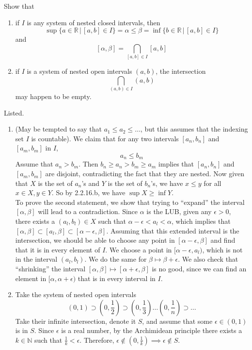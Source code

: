 \documentclass{article}
\begin{document}
    \begin{exercise}[Zorich 2.3.1]
    Show that 
    \begin{enumerate}
        \item if $I$ is any system of nested closed intervals, then 
        \[\sup\{ a \in \mathbb{R}\,|\, [a, b] \in I\} = \alpha \leq \beta = \inf\{ b \in \mathbb{R}\,|\,[a, b] \in I\}\]
        and 
        \[[\alpha, \beta] = \bigcap_{[a, b] \in I} [a, b]\]
        \item if $I$ is a system of nested open intervals $(a, b)$, the intersection
        \[\bigcap_{(a, b) \in I} (a, b)\] 
        may happen to be empty. 
    \end{enumerate}
    \end{exercise}

    \begin{solution}
    Listed. 
    \begin{enumerate}
        \item (May be tempted to say that $a_1 \leq a_2 \leq \ldots$, but this assumes that the indexing set $I$ is countable). We claim that for any two intervals $[a_n, b_n]$ and $[a_m, b_m]$ in $I$, 
        \[a_n \leq b_m\]
        Assume that $a_n > b_m$. Then $b_n \geq a_n > b_m \geq a_m$ implies that $[a_n, b_n]$ and $[a_m, b_m]$ are disjoint, contradicting the fact that they are nested. Now given that $X$ is the set of $a_n$'s and $Y$ is the set of $b_n$'s, we have $x \leq y$ for all $x \in X, y \in Y$. So by 2.2.16.b, we have $\sup{X} \geq \inf{Y}$. 
        \\
        To prove the second statement, we show that trying to ``expand'' the interval $[\alpha, \beta]$ will lead to a contradiction. Since $\alpha$ is the LUB, given any $\epsilon > 0$, there exists a $(a_l, b_l) \in X$ such that $\alpha - \epsilon < a_l < \alpha$, which implies that $ [\alpha, \beta] \subset [a_l, \beta] \subset [\alpha - \epsilon, \beta]$. Assuming that this extended interval is the intersection, we should be able to choose any point in $[\alpha - \epsilon, \beta]$ and find that it is in every element of $I$. We choose a point in $[\alpha - \epsilon, a_l)$, which is not in the interval $(a_l, b_l)$. We do the same for $\beta \mapsto \beta + \epsilon$. We also check that ``shrinking'' the interval $[\alpha, \beta] \mapsto [\alpha + \epsilon, \beta]$ is no good, since we can find an element in $[\alpha, \alpha + \epsilon)$ that is in every interval in $I$. 
        
        \item Take the system of nested open intervals 
        \[(0, 1) \supset (0, \frac{1}{2}) \supset (0, \frac{1}{3}) \ldots (0, \frac{1}{n}) \supset \ldots\]
        Take their infinite intersection, denote it $S$, and assume that some $\epsilon \in (0, 1)$ is in $S$. Since $\epsilon$ is a real number, by the Archimidean principle there exists a $k \in \mathbb{N}$ such that $\frac{1}{k} < \epsilon$. Therefore, $\epsilon \not\in (0, \frac{1}{k}) \implies \epsilon \not\in S$. 
    \end{enumerate}
    \end{solution}
\end{document}
